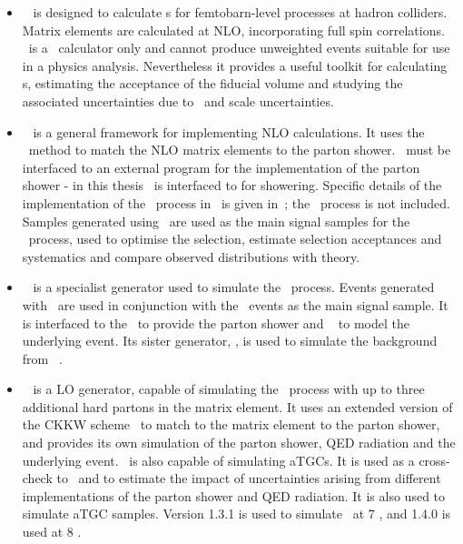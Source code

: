 \begin{itemize}
    \item \mcfm ~\cite{Campbell:2011} is designed to calculate \cx s for
    femtobarn-level processes at hadron colliders. Matrix elements are
    calculated at NLO, incorporating full spin correlations. \mcfm\ is a \cx\
    calculator only and cannot produce unweighted events suitable for use in a
    physics analysis. Nevertheless it provides a useful toolkit for calculating
    \cx s, estimating the acceptance of the fiducial volume and studying the
    associated uncertainties due to \partDF\ and scale uncertainties.

    \item \powhegbox~\cite{Alioli:2010xd} is a general framework for implementing
    NLO calculations. It uses the \powheg\ method to match the NLO matrix
    elements to the parton shower. \powhegbox\ must be interfaced to an external
    program for the implementation of the parton shower - in this thesis
    \powhegbox\ is interfaced to \pythia for showering. Specific details of the
    implementation of the \ZZ\ process in \powhegbox\ is given
    in~\cite{Melia:2011tj}; the \ggZZ\ process is not included. 
    Samples generated using \powhegbox\ are used as the main signal samples for
    the \qqZZ\ process, used to optimise the selection, estimate selection
    acceptances and systematics and compare observed distributions with theory.

    \item \ggtwoZZ~\cite{gg2ZZ} is a specialist generator used to simulate the
    \ggZZ\ process. Events generated with \ggtwoZZ\ are used in conjunction with
    the \powhegbox\ events as the main signal sample. It is interfaced to the
    \herwig\ to provide the parton shower and \jimmy~\cite{bib:jimmy} to model the underlying
    event. Its sister generator, \ggtwoWW, is used to simulate the background
    from \ggWW~\cite{Binoth:2006mf}.

    \item \sherpa~\cite{Gleisberg:2008ta} is a LO generator, capable of
    simulating the \qqZZ\ process with up to three additional hard partons in the matrix element. It
    uses an extended version of the CKKW scheme~\cite{Hoeche:2009rj} to match to the matrix element to the parton shower,
    and provides its own simulation of the parton shower, QED radiation and
    the underlying event. \sherpa\ is also capable of simulating aTGCs. It is
    used as a cross-check to \powhegbox\ and to estimate the impact
    of uncertainties
    arising from different implementations of the parton shower and QED
    radiation. It is also used to simulate aTGC samples.
    Version 1.3.1 is used to simulate \qqZZllll\ at 7 \tev, and 1.4.0 is used at
    8 \tev.


\end{itemize}
